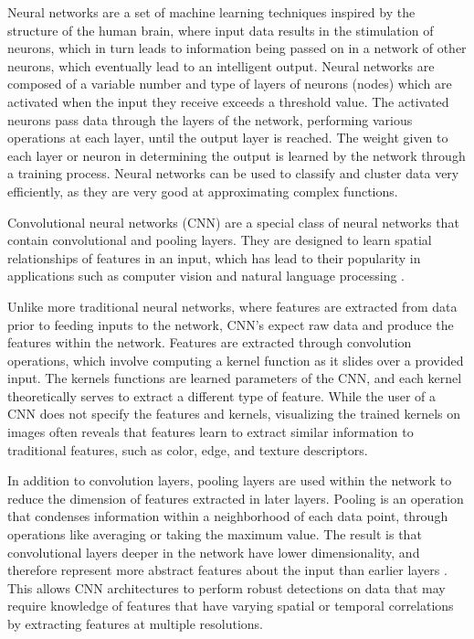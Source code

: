 \documentclass[12pt]{report}
\begin{document}
Neural networks are a set of machine learning techniques inspired by the structure of the human brain, where input data results in the stimulation of neurons, which in turn leads to information being passed on in a network of other neurons, which eventually lead to an intelligent output. Neural networks are composed of a variable number and type of layers of neurons (nodes) which are activated when the input they receive exceeds a threshold value. The activated neurons pass data through the layers of the network, performing various operations at each layer, until the output layer is reached. The weight given to each layer or neuron in determining the output is learned by the network through a training process. Neural networks can be used to classify and cluster data very efficiently, as they are very good at approximating complex functions.

Convolutional neural networks (CNN) are a special class of neural networks that contain convolutional and pooling layers. They are designed to learn spatial relationships of features in an input, which has lead to their popularity in applications such as computer vision and natural language processing \cite{Mane2020AApplications}. 

Unlike more traditional neural networks, where features are extracted from data prior to feeding inputs to the network, CNN's expect raw data and produce the features within the network. Features are extracted through convolution operations, which involve computing a kernel function as it slides over a provided input. The kernels functions are learned parameters of the CNN, and each kernel theoretically serves to extract a different type of feature. While the user of a CNN does not specify the features and kernels, visualizing the trained kernels on images often reveals that features learn to extract similar information to traditional features, such as color, edge, and texture descriptors.

In addition to convolution layers, pooling layers are used within the network to reduce the dimension of features extracted in later layers. Pooling is an operation that condenses information within a neighborhood of each data point, through operations like averaging or taking the maximum value. The result is that convolutional layers deeper in the network have lower dimensionality, and therefore represent more abstract features about the input than earlier layers \cite{Zeiler2014VisualizingNetworks}. This allows CNN architectures to perform robust detections on data that may require knowledge of features that have varying spatial or temporal correlations by extracting features at multiple resolutions.
\end{document}
